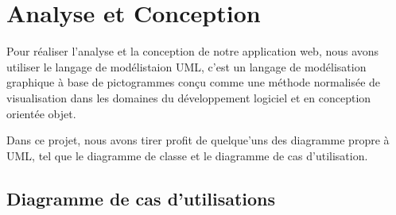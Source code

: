 \documentclass[a4paper]{report}
\begin{document}
\begin{spacing}{2}
\begin{itemize}
\end{itemize}


\chapter{Analyse et Conception}

\par
Pour réaliser l'analyse et la conception de
notre application web, nous avons utiliser le langage de modélistaion UML, c'est un langage de modélisation graphique à base de pictogrammes conçu comme une méthode normalisée de visualisation dans les domaines du développement logiciel et en conception orientée objet.

Dans ce projet, nous avons tirer profit de quelque'uns des diagramme propre à UML, tel que le diagramme de classe et le diagramme de cas d'utilisation.

\section{Diagramme de cas d’utilisations}


\end{spacing}
\end{document}
